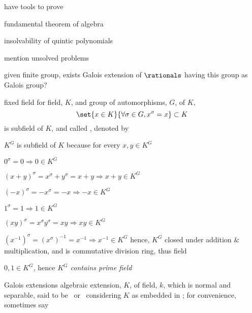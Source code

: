 \documentclass[17pt,landscape]{foils}
\begin{document}
{\vitem
	have
	tools to prove
	\bit
	\item
		fundamental theorem of algebra
	\item
		insolvability of quintic polynomials
	\eit

\vitem
	mention unsolved problems
	\bit
	\item
		given finite group, exists Galois extension of $\rationals$ having this group as Galois group?
	\eit
\eit



\begin{mydefinition}{fixed field}%
	for field, $K$, and group of automorphisms, $G$, of $K$,
	$$
		\set{x\in K}{\forall \sigma\in G, x^\sigma = x}\subset K
	$$
	is subfield of $K$, and
	called ,
	denoted by \
\end{mydefinition}

\bit
\item
	$K^G$ is subfield of $K$ because for every $x,y\in K^G$
	\bit
	\item
		$0^\sigma = 0 \Rightarrow 0\in K^G$
	\item
		$(x+y)^\sigma = x^\sigma + y^\sigma = x + y \Rightarrow x+y \in K^G$
	\item
		$(-x)^\sigma = - x^\sigma = - x \Rightarrow -x \in K^G$
	\item
		$1^\sigma = 1 \Rightarrow 1\in K^G$
	\item
		$(xy)^\sigma = x^\sigma y^\sigma = xy \Rightarrow xy\in K^G$
	\item
		$(x^{-1})^\sigma = (x^\sigma)^{-1} = x^{-1} \Rightarrow x^{-1} \in K^G$
	\eit
	hence, $K^G$ closed under addition \& multiplication,
	and is commutative division ring,
	thus field

\vitem
	$0,1\in K^G$, hence \emph{$K^G$ contains prime field}
\eit



\begin{mydefinition}{Galois extensions}%
	algebraic extension, $K$, of field, $k$,
	which is normal and separable,
	said to be \
	or \
	considering $K$ as embedded in ;
	for convenience,
	sometimes say \
\end{mydefinition}

}
\end{document}
